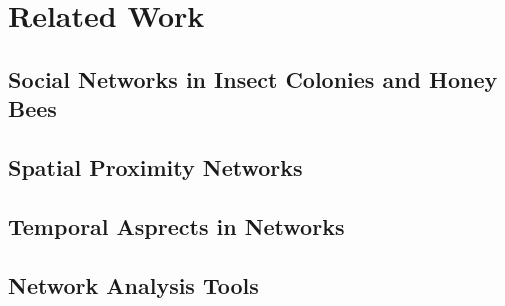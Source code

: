 \chapter{Related Work}

\section{Social Networks in Insect Colonies and Honey Bees}

\section{Spatial Proximity Networks}

\section{Temporal Asprects in Networks}

\section{Network Analysis Tools}